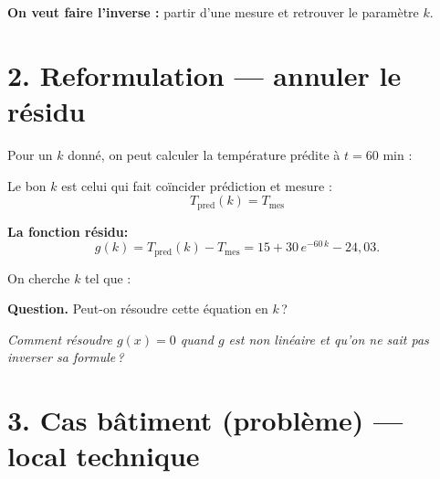 \medskip

\textbf{On veut faire l'inverse :}
partir d'une mesure
et retrouver le paramètre $k$.

\section*{2. Reformulation --- annuler le résidu}

Pour un $k$ donné, on peut calculer la température prédite
à $t = 60$ min :
\atrou[2cm]{%
\[
  T_{\mathrm{pred}}(k) = 15 + 30\,e^{-60\,k}.
\]}

Le bon $k$ est celui qui fait coïncider prédiction et mesure :
\[
  T_{\mathrm{pred}}(k) = T_{\mathrm{mes}}
\]

\medskip

\textbf{La fonction résidu:}
\[
  g(k) = T_{\mathrm{pred}}(k) - T_{\mathrm{mes}} = 15 + 30\,e^{-60\,k} - 24{,}03.
\]

On cherche $k$ tel que : 
\atrou[1cm]{%
\[
  g(k) = 0.
\]
}

\medskip

\textbf{Question.}
Peut-on résoudre cette équation en $k$\,?


\bigskip

\begin{center}
\begin{mdframed}[backgroundcolor=ThemeLight, linecolor=Theme,
  linewidth=1pt, innertopmargin=8pt, innerbottommargin=8pt]
\centering\itshape
Comment résoudre $g(x) = 0$
quand $g$ est non linéaire
et qu'on ne sait pas inverser sa formule\,?
\end{mdframed}
\end{center}
  
\newpage
\section*{3. Cas bâtiment (problème) --- local technique}

